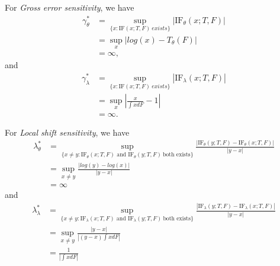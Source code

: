 \begin{solution}
    For \emph{Gross error sensitivity}, we have
    \begin{equation*}
        \begin{split}
            \gamma^*_\theta & = \sup_{\{ x: \text{IF}(x;T,F)\ exists\}} |\text{IF}_\theta(x;T,F)|     \\
            & = \sup_x |log(x) - T_\theta(F) |\\
            & = \infty,
        \end{split}
    \end{equation*}
    and
    \begin{equation*}
        \begin{split}
            \gamma^*_\lambda & = \sup_{\{ x: \text{IF}(x;T,F)\ exists\}} |\text{IF}_\lambda(x;T,F)|     \\
            & = \sup_{x} \left| \frac{x}{\int x dF} - 1 \right| \\
            & = \infty.
        \end{split}
    \end{equation*}


    For \emph{Local shift sensitivity}, we have
    \begin{equation*}
        \begin{split}
            \lambda^*_\theta & = \sup_{\{ x\neq y: \text{IF}_\theta(x;T,F) \text{ and } \text{IF}_\theta (y;T,F)  \ \text{both exists}\}} \frac{| \text{IF}_\theta (y;T,F) - \text{IF}_\theta (x;T,F)|}{|y-x|} \\
            & = \sup_{x\neq y} \frac{|log(y)-log(x)|}{|y-x|} \\
            & = \infty
        \end{split}
    \end{equation*}
    and
    \begin{equation*}
        \begin{split}
            \lambda^*_\lambda & = \sup_{\{ x\neq y: \text{IF}_\lambda(x;T,F) \text{ and } \text{IF}_\lambda (y;T,F)  \ \text{both exists}\}} \frac{| \text{IF}_\lambda (y;T,F) - \text{IF}_\lambda (x;T,F)|}{|y-x|} \\
            & = \sup_{x\neq y} \frac{|y-x|}{|(y-x)\int x dF|} \\
            & = \frac{1}{|\int x dF|}
        \end{split}
    \end{equation*}
    

\end{solution}

